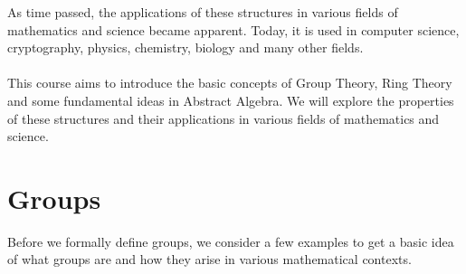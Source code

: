 \documentclass[openany]{book}
\begin{document}
    As time passed, the applications of these structures in various fields of mathematics and science became apparent. Today, it is used in computer science, cryptography, physics, chemistry, biology and many other fields. \\\\
    This course aims to introduce the basic concepts of Group Theory, Ring Theory and some fundamental ideas in Abstract Algebra. We will explore the properties of these structures and their applications in various fields of mathematics and science.

\chapter{Groups}
Before we formally define groups, we consider a few examples to get a basic idea of what groups are and how they arise in various mathematical contexts.
\end{document}

